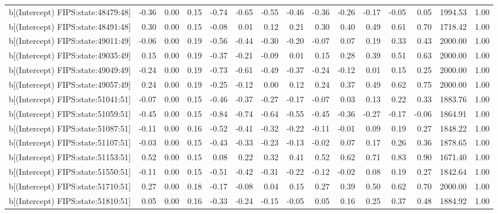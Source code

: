 \begin{table}[ht]
\begin{tabular}{rrrrrrrrrrrrrrr}
  b[(Intercept) FIPS:state:48479:48] & -0.36 & 0.00 & 0.15 & -0.74 & -0.65 & -0.55 & -0.46 & -0.36 & -0.26 & -0.17 & -0.05 & 0.05 & 1994.53 & 1.00 \\ 
  b[(Intercept) FIPS:state:48491:48] & 0.30 & 0.00 & 0.15 & -0.08 & 0.01 & 0.12 & 0.21 & 0.30 & 0.40 & 0.49 & 0.61 & 0.70 & 1718.42 & 1.00 \\ 
  b[(Intercept) FIPS:state:49011:49] & -0.06 & 0.00 & 0.19 & -0.56 & -0.44 & -0.30 & -0.20 & -0.07 & 0.07 & 0.19 & 0.33 & 0.43 & 2000.00 & 1.00 \\ 
  b[(Intercept) FIPS:state:49035:49] & 0.15 & 0.00 & 0.19 & -0.37 & -0.21 & -0.09 & 0.01 & 0.15 & 0.28 & 0.39 & 0.51 & 0.63 & 2000.00 & 1.00 \\ 
  b[(Intercept) FIPS:state:49049:49] & -0.24 & 0.00 & 0.19 & -0.73 & -0.61 & -0.49 & -0.37 & -0.24 & -0.12 & 0.01 & 0.15 & 0.25 & 2000.00 & 1.00 \\ 
  b[(Intercept) FIPS:state:49057:49] & 0.24 & 0.00 & 0.19 & -0.25 & -0.12 & 0.00 & 0.12 & 0.24 & 0.37 & 0.49 & 0.62 & 0.75 & 2000.00 & 1.00 \\ 
  b[(Intercept) FIPS:state:51041:51] & -0.07 & 0.00 & 0.15 & -0.46 & -0.37 & -0.27 & -0.17 & -0.07 & 0.03 & 0.13 & 0.22 & 0.33 & 1883.76 & 1.00 \\ 
  b[(Intercept) FIPS:state:51059:51] & -0.45 & 0.00 & 0.15 & -0.84 & -0.74 & -0.64 & -0.55 & -0.45 & -0.36 & -0.27 & -0.17 & -0.06 & 1864.91 & 1.00 \\ 
  b[(Intercept) FIPS:state:51087:51] & -0.11 & 0.00 & 0.16 & -0.52 & -0.41 & -0.32 & -0.22 & -0.11 & -0.01 & 0.09 & 0.19 & 0.27 & 1848.22 & 1.00 \\ 
  b[(Intercept) FIPS:state:51107:51] & -0.03 & 0.00 & 0.15 & -0.43 & -0.33 & -0.23 & -0.13 & -0.02 & 0.07 & 0.17 & 0.26 & 0.36 & 1878.65 & 1.00 \\ 
  b[(Intercept) FIPS:state:51153:51] & 0.52 & 0.00 & 0.15 & 0.08 & 0.22 & 0.32 & 0.41 & 0.52 & 0.62 & 0.71 & 0.83 & 0.90 & 1671.40 & 1.00 \\ 
  b[(Intercept) FIPS:state:51550:51] & -0.11 & 0.00 & 0.15 & -0.51 & -0.42 & -0.31 & -0.22 & -0.12 & -0.02 & 0.08 & 0.19 & 0.27 & 1842.64 & 1.00 \\ 
  b[(Intercept) FIPS:state:51710:51] & 0.27 & 0.00 & 0.18 & -0.17 & -0.08 & 0.04 & 0.15 & 0.27 & 0.39 & 0.50 & 0.62 & 0.70 & 2000.00 & 1.00 \\ 
  b[(Intercept) FIPS:state:51810:51] & 0.05 & 0.00 & 0.16 & -0.33 & -0.24 & -0.15 & -0.05 & 0.05 & 0.16 & 0.25 & 0.37 & 0.48 & 1884.92 & 1.00 \\ 

\end{tabular}
\end{table}
